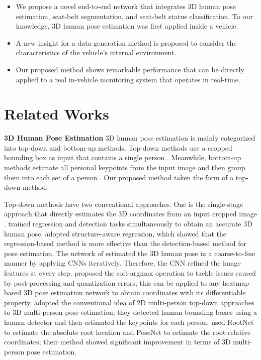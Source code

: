 \documentclass[letterpaper]{article} %
\begin{document}
\begin{itemize}
\item We propose a novel end-to-end network that integrates 3D human pose estimation, seat-belt segmentation, and seat-belt status classification. To our knowledge, 3D human pose estimation was first applied inside a vehicle.
\item A new insight for a data generation method is proposed to consider the characteristics of the vehicle's internal environment.
\item Our proposed method shows remarkable performance that can be directly applied to a real in-vehicle monitoring system that operates in real-time.
\end{itemize}

\section{Related Works}
\textbf{3D Human Pose Estimation}
3D human pose estimation is mainly categorized into top-down and bottom-up methods. Top-down methods use a cropped bounding box as input that contains a single person \cite{li20143d, sun2017compositional, pavlakos2017coarse, sun2018integral, moon2019camera, martinez2017simple, nie2017monocular, gong2021poseaug, llopart2020liftformer}. Meanwhile, bottom-up methods estimate all personal keypoints from the input image and then group them into each set of a person \cite{fabbri2020compressed, li2020hmor, lin2020hdnet, mehta2020xnect, wang2010combined}. Our proposed method taken the form of a top-down method.

Top-down methods have two conventional approaches. One is the single-stage approach that directly estimates the 3D coordinates from an input cropped image \cite{li20143d, sun2017compositional, pavlakos2017coarse, sun2018integral, moon2019camera}. \cite{li20143d} trained regression and detection tasks simultaneously to obtain an accurate 3D human pose. \cite{sun2017compositional} adopted structure-aware regression, which showed that the regression-based method is more effective than the detection-based method for pose estimation. The network of \cite{pavlakos2017coarse} estimated the 3D human pose in a coarse-to-fine manner by applying CNNs iteratively. Therefore, the CNN refined the image features at every step. \cite{sun2018integral} proposed the soft-argmax operation to tackle issues caused by post-processing and quantization errors; this can be applied to any heatmap-based 3D pose estimation network to obtain coordinates with its differentiable property. \cite{moon2019camera} adopted the conventional idea of 2D multi-person top-down approaches to 3D multi-person pose estimation; they detected human bounding boxes using a human detector and then estimated the keypoints for each person. \cite{moon2019camera} used RootNet to estimate the absolute root location and PoseNet to estimate the root-relative coordinates; their method showed significant improvement in terms of 3D multi-person pose estimation.
\end{document}
